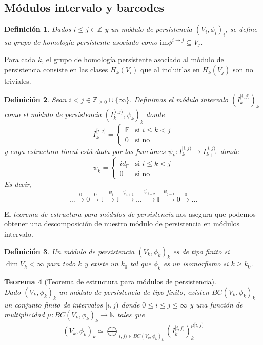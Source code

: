 \documentclass[12pt,a4paper]{article}
\newtheorem{theorem}{Teorema}[section]
\newtheorem{definition}[theorem]{Definición}
\begin{document}
\subsection{Módulos intervalo y barcodes}
\begin{definition}
Dados $i \leq j \in \mathbb{Z}$ y un módulo de persistencia $(V_i, \phi_i)_i$, se define su \textit{grupo de homología persistente asociado} como $\text{im}\phi^{i \rightarrow j} \subseteq V_j$.
\end{definition}
Para cada $k$, el grupo de homología persistente asociado al módulo de persistencia consiste en las clases $H_k(V_i)$ que al incluirlas en $H_k(V_j)$ son no triviales.
\begin{definition}
Sean $i < j \in \mathbb{Z}_{\geq0} \cup \{\infty\}$. Definimos el \textit{módulo intervalo} $(I_k^{[i,j)})_k$ como el módulo de persistencia $(I_k^{[i,j)}, \psi_k)_k$ donde
\[
I_k^{[i,j)} = 
\begin{cases}
  \mathbb{F} & \text{si } i \leq k < j \\
  0 & \text{si no}
\end{cases}
\]
y cuya estructura lineal está dada por las funciones $\psi_k: I_k^{[i,j)} \rightarrow I_{k+1}^{[i,j)}$ donde
\[
\psi_k = 
\begin{cases}
  id_{\mathbb{F}} & \text{si } i \leq k < j \\
  0 & \text{si no}
\end{cases}
\]
Es decir,
\[
\ldots \xrightarrow{0} 0 \xrightarrow{0} \mathbb{F} \xrightarrow{\psi_i} \mathbb{F} \xrightarrow{\psi_{i+1}} \ldots \xrightarrow{\psi_{j-2}} \mathbb{F} \xrightarrow{\psi_{j-1}} 0 \xrightarrow{0} \ldots 
\]
\end{definition}
El \textit{teorema de estructura para módulos de persistencia} nos asegura que podemos obtener una descomposición de nuestro módulo de persistencia en módulos intervalo.
\begin{definition}
    Un módulo de persistencia $(V_k, \phi_k)_k$ es \textit{de tipo finito} si $\dim V_k < \infty$ para todo $k$ y existe un $k_0$ tal que $\phi_k$ es un isomorfismo si $k \geq k_0$.
\end{definition}
\begin{theorem}[Teorema de estructura para módulos de persistencia]
    \\
    Dado $(V_k, \phi_k)_k$ un módulo de persistencia de tipo finito, existen $BC(V_k, \phi_k)_k$ un conjunto finito de intervalos $[i,j)$ donde $0 \leq i \leq j \leq \infty$ y una función de multiplicidad $\mu: BC(V_k, \phi_k)_k \rightarrow \mathbb{N}$ tales que
    \[
    (V_k, \phi_k)_k \simeq \bigoplus_{[i,j) \in BC(V_k, \phi_k)_k} (I_k^{[i,j)})_k^{\mu[i,j)}
    \]
\end{theorem}
\end{document}
